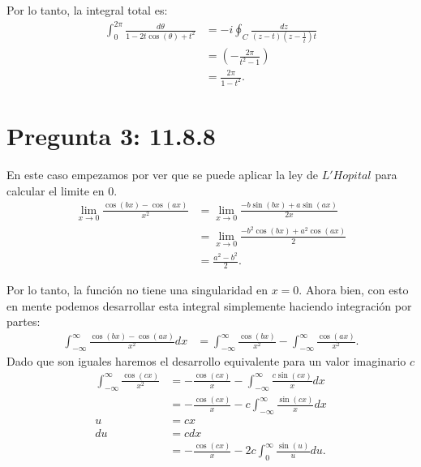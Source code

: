 \documentclass{report}
\begin{document}
Por lo tanto, la integral total es:
\begin{align*}
  \int_{0}^{2\pi} \frac{d\theta}{1 - 2t\cos\left( \theta \right) + t^2} &=-i \oint_{C} \frac{dz}{\left( z - t \right) \left( z - \frac{1}{t} \right)t }\\
  &=  \left( -\frac{2\pi}{t^2 - 1} \right)  \\
  &= \frac{2\pi}{1 - t^2}
.\end{align*}


\chapter{Pregunta 3: 11.8.8}


En este caso empezamos por ver que se puede aplicar la ley de $L'Hopital$ para calcular el limite en 0.
\begin{align*}
  \lim_{x \to 0} \frac{\cos\left( b x \right) - \cos\left( a x \right) }{x^2} &= \lim_{x \to 0} \frac{-b\sin\left( b x \right) + a\sin\left( a x \right) }{2x} \\
  &= \lim_{x \to 0} \frac{-b^2\cos\left( bx \right) + a^2\cos\left( ax \right) }{2} \\
  &= \frac{a^2 - b^2}{2}
.\end{align*}

Por lo tanto, la función no tiene una singularidad en $x = 0$. Ahora bien, con esto en mente podemos desarrollar esta integral simplemente haciendo integración por partes:
\begin{align*}
  \int_{-\infty}^{\infty}\frac{\cos\left( b x \right) - \cos\left( ax \right) }{x^2}dx &= \int_{-\infty}^{\infty} \frac{\cos\left( b x \right) }{x^2} - \int_{-\infty}^{\infty}\frac{\cos\left( a x \right) }{x^2}
.\end{align*}
Dado que son iguales haremos el desarrollo equivalente para un valor imaginario $c$
\begin{align*}
  \int_{-\infty}^{\infty} \frac{\cos\left( cx \right) }{x^2} &= - \frac{\cos\left( cx \right) }{x} - \int_{-\infty}^{\infty}\frac{c\sin\left( c x \right) }{x}dx \\
  &=  - \frac{\cos\left( cx \right) }{x} - c\int_{-\infty}^{\infty}\frac{\sin\left( c x \right) }{x}dx\\
  u &= cx \\
  du &= c dx \\
  &= - \frac{\cos\left( cx \right) }{x} - 2c\int_{0}^{\infty}\frac{\sin\left( u \right) }{u}du
.\end{align*}
\end{document}
